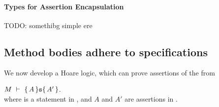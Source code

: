 \paragraph{Types for Assertion Encapsulation}
\label{types}
TODO: somethibg simple ere 
%
%

\subsection{Method bodies adhere to \AssertLang specifications}
\label{s:classical-proof}
 
We now develop a Hoare logic, which can prove assertions of the from \\
\strut \hspace{1cm} $M\ \vdash\ \{\,A\, \} {\texttt{s}} \{\,A'\, \}$.\\
where  is a statement in \Loo, and $A$ and $A'$ are assertions in \AssertLang.

